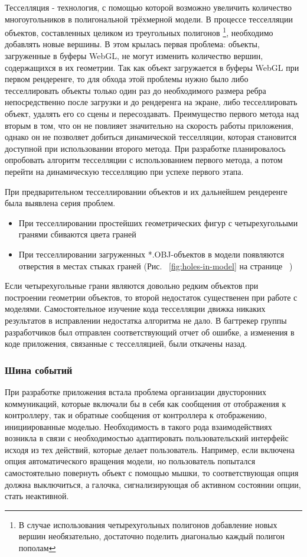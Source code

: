 \documentclass[12pt, a4paper]{article}
\begin{document}
Тесселляция - технология, с помощью которой возможно увеличить количество
многоугольников в полигональной трёхмерной модели. В процессе тесселляции
объектов, составленных целиком из треугольных полигонов \footnote{В случае
использования четырехугольных полигонов добавление новых вершин необязательно,
достаточно поделить диагональю каждый полигон пополам}, необходимо добавлять
новые вершины. В этом крылась первая проблема: объекты, загруженные в буферы
WebGL, не могут изменить количество вершин, содержащихся в их геометрии. Так как
объект загружается в буферы WebGL при первом рендеренге, то для обхода этой
проблемы нужно было либо тесселлировать объекты только один раз до
необходимого размера ребра непосредственно после загрузки и до рендеренга на
экране, либо тесселлировать объект, удалять его со сцены и пересоздавать.
Преимущество первого метода над вторым в том, что он не повлияет значительно на
скорость работы приложения, однако он не позволяет добиться динамической
тесселляции, которая становится доступной при использовании второго метода.
При разработке планировалось опробовать алгоритм тесселляции с использованием
первого метода, а потом перейти на динамическую тесселляцию при успехе первого
этапа.

При предварительном тесселлировании объектов и их дальнейшем рендеренге была
выявлена серия проблем.

\begin{itemize}
    \item При тесселлировании простейших геометрических фигур с четырехугольыми
    гранями сбиваются цвета граней
    \item При тесселлировании загруженных *.OBJ-объектов в модели появляются
    отверстия в местах стыках граней (Рис. ~\ref{fig:holes-in-model} на странице
    ~\pageref{fig:holes-in-model})
\end{itemize}


Если четырехугольные грани являются довольно редким объектов при построении
геометрии объектов, то второй недостаток существенен при работе с моделями.
Самостоятельное изучение кода тесселляции движка никаких результатов в
исправлении недостатка алгоритма не дало. В багтрекер группы разработчиков был
отправлен соответствующий отчет об ошибке, а изменения в коде приложения,
связанные с тесселляцией, были откачены назад.

\subsubsection{Шина событий}
При разработке приложения встала проблема организации двусторонних коммуникаций,
которые включали бы в себя как сообщения от отображения к контроллеру, так и
обратные сообщения от контроллера к отображению, инициированные моделью.
Необходимость в такого рода взаимодействиях возникла в связи с необходимостью
адаптировать пользовательский интерфейс исходя из тех действий, которые делает
пользователь. Например, если включена опция автоматического вращения модели,
но пользователь попытался самостоятельно повернуть объект с помощью мышки, то
соответствующая опция должна выключиться, а галочка, сигнализирующая об активном
состоянии опции, стать неактивной.
\end{document}
